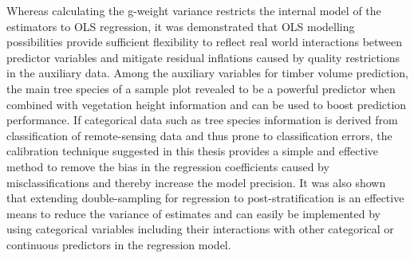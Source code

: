 Whereas calculating the g-weight variance restricts the internal model of the estimators to OLS regression, it was demonstrated that OLS modelling possibilities provide sufficient flexibility to reflect real world interactions between predictor variables and mitigate residual inflations caused by quality restrictions in the auxiliary data. Among the auxiliary variables for timber volume prediction, the main tree species of a sample plot revealed to be a powerful predictor when combined with vegetation height information and can be used to boost prediction performance. If categorical data such as tree species information is derived from classification of remote-sensing data and thus prone to classification errors, the calibration technique suggested in this thesis provides a simple and effective method to remove the bias in the regression coefficients caused by misclassifications and thereby increase the model precision. It was also shown that extending double-sampling for regression to post-stratification is an effective means to reduce the variance of estimates and can easily be implemented by using categorical variables including their interactions with other categorical or continuous predictors in the regression model.





%
%   

%


